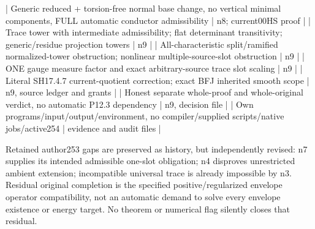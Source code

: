 \documentclass[11pt]{article}
\begin{document}
\begin{GrantData}
| Generic reduced + torsion-free normal base change, no vertical minimal components, FULL automatic conductor admissibility | n8; current00HS proof |
| Trace tower with intermediate admissibility; flat determinant transitivity; generic/residue projection towers | n9 |
| All-characteristic split/ramified normalized-tower obstruction; nonlinear multiple-source-slot obstruction | n9 |
| ONE gauge measure factor and exact arbitrary-source trace slot scaling | n9 |
| Literal SH17.4.7 current-quotient correction; exact BFJ inherited smooth scope | n9, source ledger and grants |
| Honest separate whole-proof and whole-original verdict, no automatic P12.3 dependency | n9, decision file |
| Own programs/input/output/environment, no compiler/supplied scripts/native jobs/active254 | evidence and audit files |

Retained author253 gaps are preserved as history, but independently revised: n7 supplies its intended admissible one-slot obligation; n4 disproves unrestricted ambient extension; incompatible universal trace is already impossible by n3. Residual original completion is the specified positive/regularized envelope operator compatibility, not an automatic demand to solve every envelope existence or energy target. No theorem or numerical flag silently closes that residual.

\end{GrantData}
\end{document}
